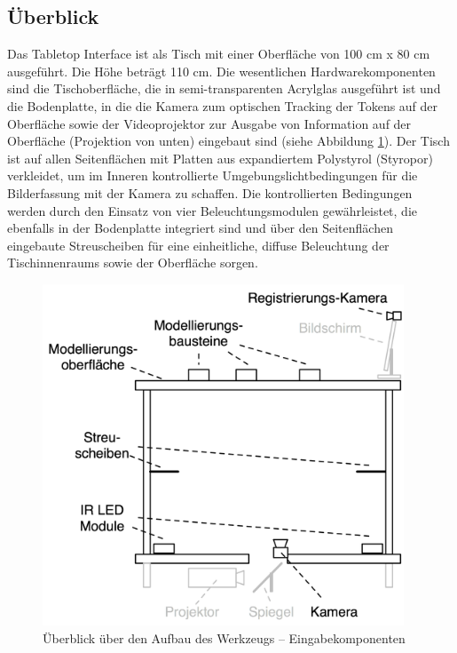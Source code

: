 \subsection{Überblick} %
\label{sub:Überblick}

Das Tabletop Interface ist als Tisch mit einer Oberfläche von 100 cm x 80 cm ausgeführt. Die Höhe beträgt 110 cm. Die wesentlichen Hardwarekomponenten sind die Tischoberfläche, die in semi-transparenten Acrylglas ausgeführt ist und die Bodenplatte, in die die Kamera zum optischen Tracking der Tokens auf der Oberfläche sowie der Videoprojektor zur Ausgabe von Information auf der Oberfläche (Projektion von unten) eingebaut sind (siehe Abbildung \ref{fig:img_ImplementierungInput_TischSeitenansicht}). Der Tisch ist auf allen Seitenflächen mit Platten aus expandiertem Polystyrol (Styropor) verkleidet, um im Inneren kontrollierte Umgebungslichtbedingungen für die Bilderfassung mit der Kamera zu schaffen. Die kontrollierten Bedingungen werden durch den Einsatz von vier Beleuchtungsmodulen gewährleistet, die ebenfalls in der Bodenplatte integriert sind und über den Seitenflächen eingebaute Streuscheiben für eine einheitliche, diffuse Beleuchtung der Tischinnenraums sowie der Oberfläche sorgen.

\begin{figure}[htbp]
	\centering
		\includegraphics[height=4in]{img/ImplementierungInput/TischSeitenansichtInput.png}
	\caption{Überblick über den Aufbau des Werkzeugs -- Eingabekomponenten}
	\label{fig:img_ImplementierungInput_TischSeitenansicht}
\end{figure}

